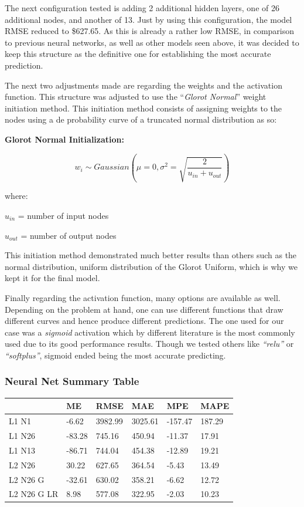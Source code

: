 \documentclass[
  paper=a4,
  ,captions=tableheading
]{scrartcl}
\begin{document}
The next configuration tested is adding 2 additional hidden layers, one
of 26 additional nodes, and another of 13. Just by using this
configuration, the model RMSE reduced to \$627.65. As this is already a
rather low RMSE, in comparison to previous neural networks, as well as
other models seen above, it was decided to keep this structure as the
definitive one for establishing the most accurate prediction.

The next two adjustments made are regarding the weights and the
activation function. This structure was adjusted to use the
``\emph{Glorot Normal}'' weight initiation method. This initiation
method consists of assigning weights to the nodes using a de probability
curve of a truncated normal distribution as so:

\textbf{Glorot Normal Initialization:}

\[w_{i} \sim Gaussian \left(\mu = 0, \sigma^{2} = \sqrt{\frac{2} {u_{in} + u_{out} }}\right)\]

where:

\(u_{in}\) = number of input nodes

\(u_{out}\) = number of output nodes

This initiation method demonstrated much better results than others such
as the normal distribution, uniform distribution of the Glorot Uniform,
which is why we kept it for the final model.

Finally regarding the activation function, many options are available as
well. Depending on the problem at hand, one can use different functions
that draw different curves and hence produce different predictions. The
one used for our case was a \emph{sigmoid} activation which by different
literature is the most commonly used due to its good performance
results. Though we tested others like \emph{``relu''} or
\emph{``softplus''}, sigmoid ended being the most accurate predicting.

\hypertarget{neural-net-summary-table}{%
\subsubsection{Neural Net Summary
Table}\label{neural-net-summary-table}}

\begin{table}
\centering
\begin{tabular}{l|l|l|l|l|l}
\hline
  & ME & RMSE & MAE & MPE & MAPE\\
\hline
L1 N1 & -6.62 & 3982.99 & 3025.61 & -157.47 & 187.29\\
\hline
L1 N26 & -83.28 & 745.16 & 450.94 & -11.37 & 17.91\\
\hline
L1 N13 & -86.71 & 744.04 & 454.38 & -12.89 & 19.21\\
\hline
L2 N26 & 30.22 & 627.65 & 364.54 & -5.43 & 13.49\\
\hline
L2 N26 G & -32.61 & 630.02 & 358.21 & -6.62 & 12.72\\
\hline
L2 N26 G LR & 8.98 & 577.08 & 322.95 & -2.03 & 10.23\\
\hline
\end{tabular}
\end{table}
\end{document}
